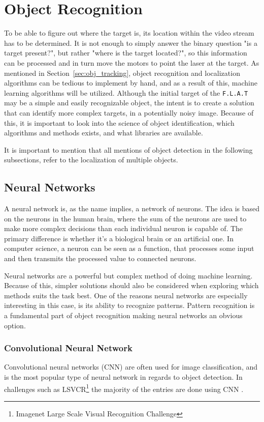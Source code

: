 \section{Object Recognition}
To be able to figure out where the target is, its location within the video stream has to be determined.
It is not enough to simply answer the binary question "is a target present?", but rather "where is the target located?", so this information can be processed and in turn move the motors to point the laser at the target.
As mentioned in Section~\ref{sec:obj_tracking}, object recognition and localization algorithms can be tedious to implement by hand, and as a result of this, machine learning algorithms will be utilized.
Although the initial target of the \texttt{F.L.A.T} may be a simple and easily recognizable object, the intent is to create a solution that can identify more complex targets, in a potentially noisy image.
Because of this, it is important to look into the science of object identification, which algorithms and methods exists, and what libraries are available.

It is important to mention that all mentions of object detection in the following subsections, refer to the localization of multiple objects.

\subsection{Neural Networks}
A neural network is, as the name implies, a network of neurons.
The idea is based on the neurons in the human brain, where the sum of the neurons are used to make more complex decisions than each individual neuron is capable of.
The primary difference is whether it's a biological brain or an artificial one. 
In computer science, a neuron can be seen as a function, that processes some input and then transmits the processed value to connected neurons.

Neural networks are a powerful but complex method of doing machine learning.
Because of this, simpler solutions should also be considered when exploring which methods suits the task best.
One of the reasons neural networks are especially interesting in this case, is its ability to recognize patterns.
Pattern recognition is a fundamental part of object recognition making neural networks an obvious option.

\subsubsection{Convolutional Neural Network}
\label{sec:cnn}
Convolutional neural networks (CNN) are often used for image classification, and is the most popular type of neural network in regards to object detection.
In challenges such as LSVCR\footnote{Imagenet Large Scale Visual Recognition Challenge} the majority of the entries are done using CNN \cite{ILSVRC_Results}. 


